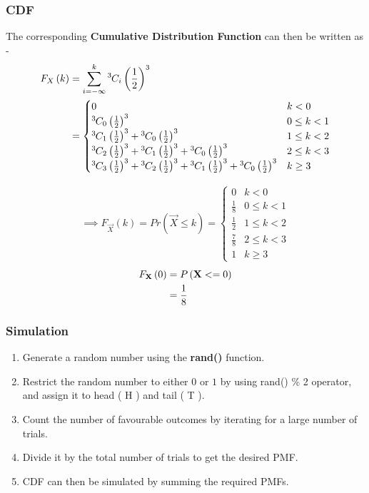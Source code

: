 \documentclass{beamer}
\begin{document}
\begin{frame}
\frametitle{CDF}
The corresponding \textbf{Cumulative Distribution Function} can then be written as - 
\begin{align}
  F_{X}\left(k\right) &= \sum_{i = -\infty}^k{{}^{3}\mkern-1muC_{i}}\left(\frac{1}{2}\right)^3 \\
  &= \begin{cases}
    0 & k < 0\\
    {{}^{3}\mkern-1muC_{0}}\left(\frac{1}{2}\right)^3 & 0 \le k < 1\\
    {{}^{3}\mkern-1muC_{1}}\left(\frac{1}{2}\right)^3 + {{}^{3}\mkern-1muC_{0}}\left(\frac{1}{2}\right)^3 & 1 \le k < 2\\
    {{}^{3}\mkern-1muC_{2}}\left(\frac{1}{2}\right)^3 + {{}^{3}\mkern-1muC_{1}}\left(\frac{1}{2}\right)^3 + {{}^{3}\mkern-1muC_{0}}\left(\frac{1}{2}\right)^3  & 2 \le k < 3\\
    {{}^{3}\mkern-1muC_{3}}\left(\frac{1}{2}\right)^3 + {{}^{3}\mkern-1muC_{2}}\left(\frac{1}{2}\right)^3 + {{}^{3}\mkern-1muC_{1}}\left(\frac{1}{2}\right)^3 + {{}^{3}\mkern-1muC_{0}}\left(\frac{1}{2}\right)^3 & k \geq 3\\
  \end{cases}
\end{align}
\end{frame}

\begin{frame}
\begin{align}
\implies F_{\vec{X}}(k) = Pr(\vec{X} \leq k) =
\begin{cases}
    0 & k < 0 \\
    \frac{1}{8} & 0 \leq k < 1 \\
    \frac{1}{2} & 1 \leq k < 2 \\
    \frac{7}{8} & 2 \leq k < 3 \\
    1 & k \geq 3
\end{cases}
\end{align}
\begin{align}
	F_{\mathbf{X}} \left(0\right) &= P \left( \mathbf{X} <= 0 \right) \\
	                     &= \frac{1}{8}
\end{align}
\end{frame}

\begin{frame}
\frametitle{Simulation}
\begin{enumerate}
	\item Generate a random number using the \textbf{rand()} function. 
	\item Restrict the random number to either $0$ or $1$ by using rand() \% 2 operator, and assign it to head ( H ) and tail ( T ).
	\item Count the number of favourable outcomes by iterating for a large number of trials.
	\item Divide it by the total number of trials to get the desired PMF.
	\item CDF can then be simulated by summing the required PMFs.
\end{enumerate}
\end{frame}
\end{document}

